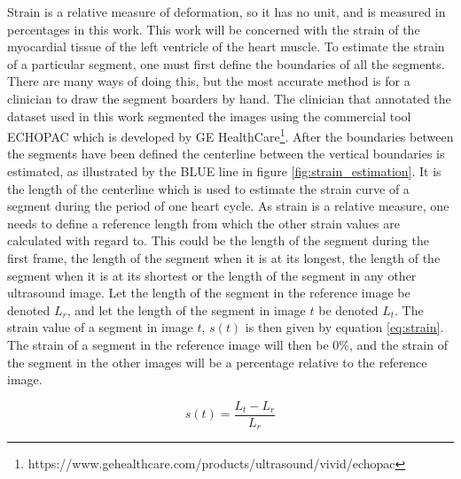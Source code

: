 Strain is a relative measure of deformation, so it has no unit, and is measured in percentages in this work. This work will be concerned with the strain of the myocardial tissue of the left ventricle of the heart muscle. To estimate the strain of a particular segment, one must first define the boundaries of all the segments. There are many ways of doing this, but the most accurate method is for a clinician to draw the segment boarders by hand. The clinician that annotated the dataset used in this work segmented the images using the commercial tool ECHOPAC which is developed by GE HealthCare\footnote{https://www.gehealthcare.com/products/ultrasound/vivid/echopac}. After the boundaries between the segments have been defined the centerline between the vertical boundaries is estimated, as illustrated by the BLUE line in figure \ref{fig:strain_estimation}. It is the length of the centerline which is used to estimate the strain curve of a segment during the period of one heart cycle. As strain is a relative measure, one needs to define a reference length from which the other strain values are calculated with regard to. This could be the length of the segment during the first frame, the length of the segment when it is at its longest, the length of the segment when it is at its shortest or the length of the segment in any other ultrasound image. Let the length of the segment in the reference image be denoted $L_r$, and let the length of the segment in image $t$ be denoted $L_t$. The strain value of a segment in image $t$, $s(t)$ is then given by equation \eqref{eq:strain}. The strain of a segment in the reference image will then be $0\%$, and the strain of the segment in the other images will be a percentage relative to the reference image. \bigskip

\begin{equation}
    s(t) = \frac{L_t - L_r}{L_r}
    \label{eq:strain}
\end{equation}

